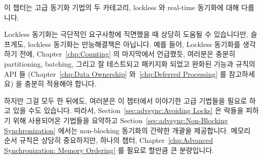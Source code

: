 
%

이 챕터는 고급 동기화 기법의 두 카테고리, lockless 와 real-time 동기화에 대해
다룹니다.

Lockless 동기화는 극단적인 요구사항에 직면했을 때 상당히 도움될 수 있습니다만,
슬프게도, lockless 동기화는 만능해결책은 아닙니다.
예를 들어, Lockless 동기화를 생각하기 전에, Chapter~\ref{chp:Counting} 의
마지막에서 언급했듯, 여러분은 충분히 partitioning, batching, 그리고 잘
테스트되고 패키지화 되었고 완화된 기능과 규칙의 API 들
(Chapter~\ref{chp:Data Ownership} 와~\ref{chp:Deferred Processing} 를
참고하세요) 을 충분히 적용해야 합니다.
\iffalse

This chapter covers two categories of advanced
synchronization, namely lockless and real-time synchronization.

Lockless synchronization can be quite helpful when faced with extreme
requirements, but sadly, lockless synchronization is no panacea.
For example, as noted at the end of
Chapter~\ref{chp:Counting},
you should thoroughly apply partitioning, batching, and
well-tested packaged weak APIs (see Chapter~\ref{chp:Data Ownership}
and~\ref{chp:Deferred Processing})
before even thinking about lockless synchronization.
\fi

하지만 그걸 모두 한 뒤에도, 여러분은 이 챕터에서 이야기한 고급 기법들을 필요로
하고 있을 수도 있습니다.
따라서,
Section~\ref{sec:advsync:Avoiding Locks}
은 락들을 피하기 위해 사용되어온 기법들을 요약하고
Section~\ref{sec:advsync:Non-Blocking Synchronization}
에서는 non-blocking 동기화의 간략한 개괄을 제공합니다.
메모리 순서 규칙은 상당히 중요하지만, 하나의 챕터,
Chapter~\ref{chp:Advanced Synchronization: Memory Ordering} 를 필요로 할만큼 큰
분량입니다.
\iffalse

But after doing all that, you still might find yourself needing the
advanced techniques described in this chapter.
To that end,
Section~\ref{sec:advsync:Avoiding Locks}
summarizes techniques used thus far for avoiding locks and
Section~\ref{sec:advsync:Non-Blocking Synchronization}
gives a brief overview of non-blocking synchronization.
Memory ordering is also quite important, but is sufficiently large
to warrant its own chapter, namely
Chapter~\ref{chp:Advanced Synchronization: Memory Ordering}.
\fi

